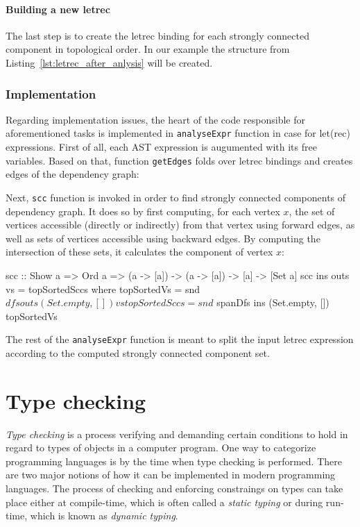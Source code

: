 \documentclass[12pt,a4paper]{report}
\begin{document}
\subsubsection{Building a new letrec}
The last step is to create the letrec binding for each strongly
connected component in topological order. In our example the structure from
Listing~\ref{lst:letrec_after_anlysis} will be created.


\subsection{Implementation}
Regarding implementation issues, the heart of the code responsible for
aforementioned tasks is implemented in \texttt{analyseExpr} function in case
for let(rec) expressions. First of all, each AST expression is
augumented with its free variables. Based on that, function \texttt{getEdges}
folds over letrec bindings and creates edges of the dependency graph:

\vspace*{0.2in}

Next, \texttt{scc} function is invoked in order to find strongly connected
components of dependency graph. It does so by first computing, for each vertex
$x$, the set of vertices accessible (directly or indirectly) from that vertex
using forward edges, as well as sets of vertices accessible using backward
edges. By computing the intersection of these sets, it calculates the component
of vertex $x$:

\vspace*{0.2in}
\begin{code}[style=haskell]
  scc :: Show a => Ord a => (a -> [a]) -> (a -> [a]) -> [a] -> [Set a]
  scc ins outs vs = topSortedSccs
      where
          topSortedVs = snd $ dfs outs (Set.empty, []) vs
          topSortedSccs = snd $ spanDfs ins (Set.empty, []) topSortedVs
\end{code}

The rest of the \texttt{analyseExpr} function is meant to split the input
letrec expression according to the computed strongly connected
component set.

\chapter{Type checking}
\textit{Type checking} is a process verifying and demanding certain conditions
to hold in regard to types of objects in a computer program. One way to
categorize programming languages is by the time when type checking is
performed. There are two major notions of how it can be implemented in modern
programming languages. The process of checking and enforcing constraings on
types can take place either at compile-time, which is often called a
\textit{static typing} or during run-time, which is known as \textit{dynamic
typing}.
\end{document}
